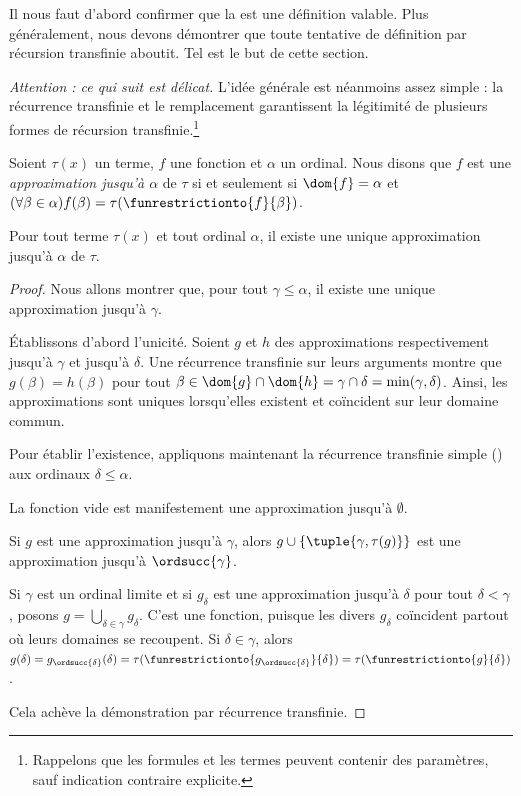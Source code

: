 \documentclass[../../../include/open-logic-section]{subfiles}
\begin{document}

Il nous faut d'abord confirmer que la  est une
définition valable. Plus généralement, nous devons démontrer que
toute tentative de définition par récursion transfinie aboutit. Tel
est le but de cette section.

\emph{Attention : ce qui suit est délicat.} L'idée générale est
néanmoins assez simple : la récurrence transfinie et le remplacement
garantissent la légitimité de plusieurs formes de récursion
transfinie.\footnote{Rappelons que les formules et les termes peuvent
contenir des paramètres, sauf indication contraire explicite.}

\begin{defn}
Soient $\tau(x)$ un terme, $f$ une fonction et $\alpha$ un ordinal.
Nous disons que $f$ est une \emph{approximation jusqu'à $\alpha$} de
$\tau$ si et seulement si $\dom{f} = \alpha$ et
$(\forall \beta \in \alpha)f(\beta) =
\tau(\funrestrictionto{f}{\beta})$.
\end{defn}

\begin{lem}
Pour tout terme $\tau(x)$ et tout ordinal $\alpha$, il existe une
unique approximation jusqu'à $\alpha$ de $\tau$.
\end{lem}
\begin{proof}
Nous allons montrer que, pour tout $\gamma \leq \alpha$, il existe
une unique approximation jusqu'à $\gamma$.

Établissons d'abord l'unicité. Soient $g$ et $h$ des approximations
respectivement jusqu'à $\gamma$ et jusqu'à $\delta$. Une récurrence
transfinie sur leurs arguments montre que
$g(\beta) = h(\beta)$ pour tout
$\beta \in \dom{g} \cap \dom{h} = \gamma \cap \delta =
\min(\gamma, \delta)$. Ainsi, les approximations sont uniques
lorsqu'elles existent et coïncident sur leur domaine commun.

Pour établir l'existence, appliquons maintenant la récurrence
transfinie simple () aux
ordinaux $\delta \leq \alpha$.

La fonction vide est manifestement une approximation jusqu'à
$\emptyset$.

Si $g$ est une approximation jusqu'à $\gamma$, alors
$g \cup \{\tuple{\gamma, \tau(g)}\}$ est une approximation jusqu'à
$\ordsucc{\gamma}$.

Si $\gamma$ est un ordinal limite et si $g_\delta$ est une
approximation jusqu'à $\delta$ pour tout $\delta < \gamma$, posons
$g = \bigcup_{\delta \in \gamma} g_\delta$. C'est une fonction,
puisque les divers $g_\delta$ coïncident partout où leurs domaines se
recoupent. Si $\delta \in \gamma$, alors
$g(\delta) = g_{\ordsucc{\delta}}(\delta) =
\tau(\funrestrictionto{g_{\ordsucc{\delta}}}{\delta}) =
\tau(\funrestrictionto{g}{\delta})$.

Cela achève la démonstration par récurrence transfinie.
\end{proof}
\end{document}
